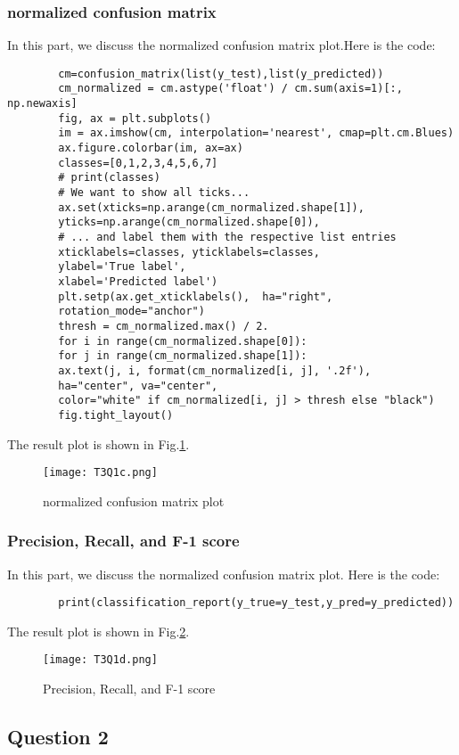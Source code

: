 \documentclass[conference]{IEEEtran}
\begin{document}
	\subsubsection{normalized confusion matrix}
	In this part, we discuss the normalized confusion matrix plot.Here is the code:
	\begin{lstlisting}
		cm=confusion_matrix(list(y_test),list(y_predicted))
		cm_normalized = cm.astype('float') / cm.sum(axis=1)[:, np.newaxis]
		fig, ax = plt.subplots()
		im = ax.imshow(cm, interpolation='nearest', cmap=plt.cm.Blues)
		ax.figure.colorbar(im, ax=ax)
		classes=[0,1,2,3,4,5,6,7]
		# print(classes)
		# We want to show all ticks...
		ax.set(xticks=np.arange(cm_normalized.shape[1]),
		yticks=np.arange(cm_normalized.shape[0]),
		# ... and label them with the respective list entries
		xticklabels=classes, yticklabels=classes,
		ylabel='True label',
		xlabel='Predicted label')
		plt.setp(ax.get_xticklabels(),  ha="right",
		rotation_mode="anchor")
		thresh = cm_normalized.max() / 2.
		for i in range(cm_normalized.shape[0]):
		for j in range(cm_normalized.shape[1]):
		ax.text(j, i, format(cm_normalized[i, j], '.2f'),
		ha="center", va="center",
		color="white" if cm_normalized[i, j] > thresh else "black")
		fig.tight_layout()
	\end{lstlisting}
	The result plot is shown in Fig.\ref{Fig.t3q1c}.
	\begin{figure}[h] 
		\centering
		\texttt{[image: T3Q1c.png]}
		\caption{normalized confusion matrix plot} 
		\label{Fig.t3q1c} 
	\end{figure}
	
	\subsubsection{Precision, Recall, and F-1 score}
	In this part, we discuss the normalized confusion matrix plot. Here is the code:
	\begin{lstlisting}
		print(classification_report(y_true=y_test,y_pred=y_predicted))
	\end{lstlisting}
	The result plot is shown in Fig.\ref{Fig.t3q1d}.
	\begin{figure}[h] 
		\centering
		\texttt{[image: T3Q1d.png]}
		\caption{Precision, Recall, and F-1 score} 
		\label{Fig.t3q1d} 
	\end{figure}
	
	\subsection{Question 2}
	
\end{document}
